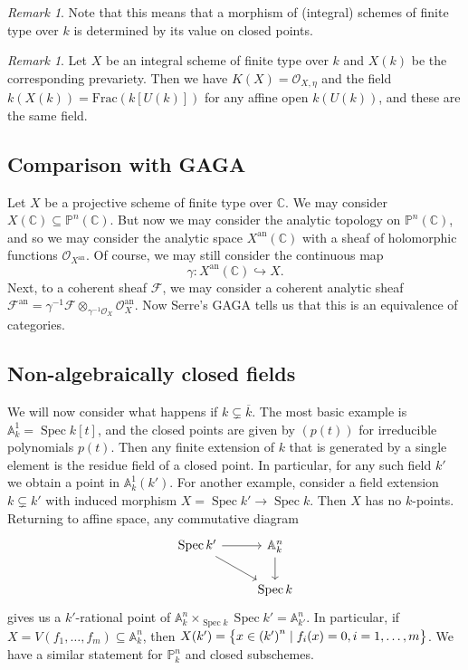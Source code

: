 \documentclass[leqno, openany]{memoir}
\theoremstyle{definition}
\theoremstyle{remark}
\newtheorem{rmk}[thm]{Remark}
\theoremstyle{plain}
\theoremstyle{definition}
\theoremstyle{remark}
\newcommand{\A}{\mathbb{A}}
\newcommand{\C}{\mathbb{C}}
\renewcommand{\P}{\mathbb{P}}
\newcommand{\mr}[1]{\mathrm{#1}}
\newcommand{\msc}[1]{\mathscr{#1}}
\newcommand{\ol}[1]{\overline{#1}}
\DeclareMathOperator{\Spec}{Spec}
\begin{document}
\begin{rmk}
    Note that this means that a morphism of (integral) schemes of finite type over $k$ is determined by its value on closed points.
\end{rmk}

\begin{rmk}
    Let $X$ be an integral scheme of finite type over $k$ and $X(k)$ be the corresponding prevariety. Then we have $K(X) = \msc{O}_{X, \eta}$ and the field $k(X(k)) = \mr{Frac}(k[U(k)])$ for any affine open $k(U(k))$, and these are the same field.
\end{rmk}

\subsection{Comparison with GAGA}%
\label{sub:comparison_with_gaga}

Let $X$ be a projective scheme of finite type over $\C$. We may consider $X(\C) \subseteq \P^n(\C)$. But now we may consider the analytic topology on $\P^n(\C)$, and so we may consider the analytic space $X^{\mr{an}}(\C)$ with a sheaf of holomorphic functions $\msc{O}_{X^{\mr{an}}}$. Of course, we may still consider the continuous map 
\[ \gamma \colon X^{\mr{an}}(\C) \hookrightarrow X. \]
Next, to a coherent sheaf $\msc{F}$, we may consider a coherent analytic sheaf $\msc{F}^{\mr{an}} = \gamma^{-1} \msc{F} \otimes_{\gamma^{-1} \msc{O}_X} \msc{O}_X^{\mr{an}}$. Now Serre's GAGA tells us that this is an equivalence of categories.

\subsection{Non-algebraically closed fields}%
\label{sub:non_algebraically_closed_fields}

We will now consider what happens if $k \subsetneq \ol{k}$. The most basic example is $\A^1_k = \Spec k[t]$, and the closed points are given by $(p(t))$ for irreducible polynomials $p(t)$. Then any finite extension of $k$ that is generated by a single element is the residue field of a closed point. In particular, for any such field $k'$ we obtain a point in $\A^1_k(k')$. For another example, consider a field extension $k \subsetneq k'$ with induced morphism $X = \Spec k' \to \Spec k$. Then $X$ has no $k$-points. Returning to affine space, any commutative diagram
\begin{equation*}
\begin{tikzcd}
    \Spec k' \ar{r} \ar{dr} & \A^n_k \ar{d} \\
                            & \Spec k
\end{tikzcd}
\end{equation*}
gives us a $k'$-rational point of $\A^n_k \times_{\Spec k} \Spec k' = \A^n_{k'}$. In particular, if $X = V(f_1, \ldots, f_m) \subseteq \A^n_k$, then $X(k') = \qty{x \in {(k')}^n \mid f_i(x) = 0, i = 1, \ldots, m}$. We have a similar statement for $\P^n_k$ and closed subschemes.
\end{document}
